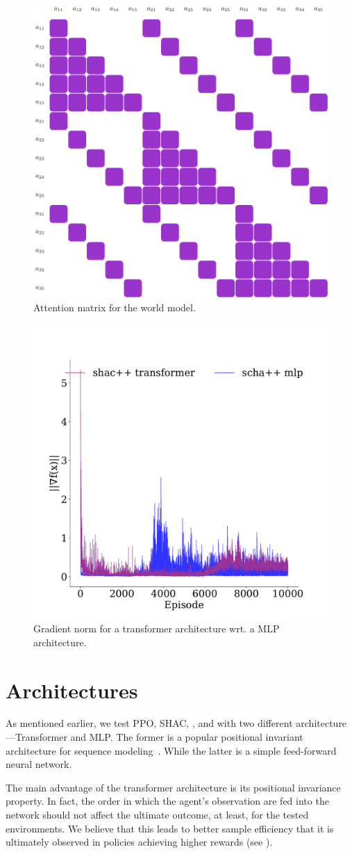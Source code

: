 

\begin{figure}[t]
    \centering
    \includegraphics[width=.45\textwidth]{figs/attention.pdf} 
    \caption{Attention matrix for the world model.}
    \label{apx:fig:attention}
\end{figure}

\begin{figure}[t]
    \centering
    \includegraphics[width=.45\textwidth]{figs/grads-mlp-transport.pdf}
    \caption{Gradient norm for a transformer architecture wrt. a MLP architecture.}
    \label{fig:grads-mlp}
\end{figure}


\section{Architectures}\label{apx:arch}

As mentioned earlier, we test PPO, SHAC, \fname{}, and \fnamer{} with two different architecture---Transformer and MLP. The former is a popular positional invariant architecture for sequence modeling~\cite{Vaswani17}. While the latter is a simple feed-forward neural network.

The main advantage of the transformer architecture is its positional invariance property. In fact, the order in which the agent's observation are fed into the network should not affect the ultimate outcome, at least, for the tested environments. We believe that this leads to better sample efficiency that it is ultimately observed in policies achieving higher rewards (see ). 

